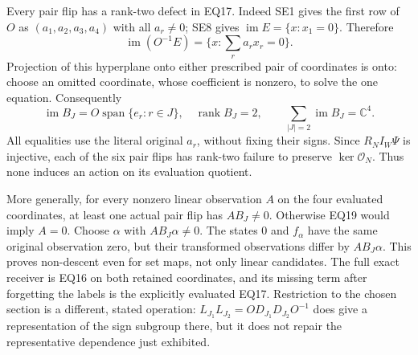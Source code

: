\documentclass[11pt]{article}
\newcommand{\C}{\mathbb C}
\newcommand{\im}{\operatorname{im}}
\newcommand{\rank}{\operatorname{rank}}
\begin{document}
Every pair flip has a rank-two defect in EQ17. Indeed SE1 gives
the first row of $O$ as $(a_1,a_2,a_3,a_4)$ with all $a_r\ne0$;
SE8 gives $\im E=\{x:x_1=0\}$. Therefore
\[
 \im(O^{-1}E)=\{x:\textstyle\sum_r a_rx_r=0\}.                     \tag{EQ18}
\]
Projection of this hyperplane onto either prescribed pair of
coordinates is onto: choose an omitted coordinate, whose coefficient
is nonzero, to solve the one equation. Consequently
\[
 \im B_J=O\operatorname{span}\{e_r:r\in J\},\quad\rank B_J=2,
 \qquad\sum_{|J|=2}\im B_J=\C^4.                                  \tag{EQ19}
\]
All equalities use the literal original $a_r$, without fixing their
signs. Since $R_NI_W\Psi$ is injective, each of the six pair flips
has rank-two failure to preserve $\ker\mathcal O_N$.
Thus none induces an action on its evaluation quotient.

More generally, for every nonzero linear observation $A$ on the
four evaluated coordinates, at least one actual pair flip has
$AB_J\ne0$. Otherwise EQ19 would imply $A=0$. Choose $\alpha$
with $AB_J\alpha\ne0$. The states $0$ and $f_\alpha$ have the same
original observation zero, but their transformed observations differ
by $AB_J\alpha$. This proves non-descent even for set maps, not only
linear candidates. The full exact receiver is EQ16 on both retained
coordinates, and its missing term after forgetting the labels is
the explicitly evaluated EQ17. Restriction to the chosen section
is a different, stated operation: $L_{J_1}L_{J_2}=OD_{J_1}D_{J_2}O^{-1}$
does give a representation of the sign subgroup there, but it does
not repair the representative dependence just exhibited.
\end{document}
